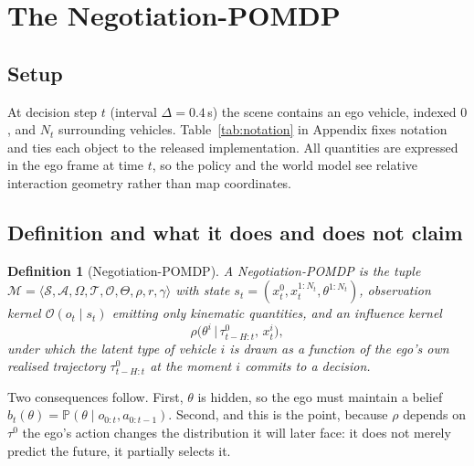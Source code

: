 \documentclass[conference]{IEEEtran}
\newcommand{\Prob}{\mathbb{P}}
\newtheorem{definition}{Definition}
\begin{document}

\section{The Negotiation-POMDP}
\label{sec:formulation}

\subsection{Setup}

At decision step $t$ (interval $\Delta = 0.4$\,s) the scene contains an ego
vehicle, indexed $0$, and $N_t$ surrounding vehicles.
Table~\ref{tab:notation} in Appendix fixes notation and ties each object to the released implementation. All quantities are expressed in the ego frame at time $t$, so the policy and the world model see relative interaction geometry rather than map
coordinates.

\subsection{Definition and what it does and does not claim}

\begin{definition}[Negotiation-POMDP]
\label{def:npomdp}
A Negotiation-POMDP is the tuple
$\mathcal{M} = \langle \mathcal{S}, \mathcal{A}, \Omega, \mathcal{T}, \mathcal{O},
\Theta, \rho, r, \gamma \rangle$
with state $s_t = (x^0_t, x^{1:N_t}_t, \theta^{1:N_t})$, observation kernel
$\mathcal{O}(o_t \mid s_t)$ emitting only kinematic quantities, and an
\emph{influence kernel}
\begin{equation}
\rho\big(\theta^i \,\big|\, \tau^0_{t-H:t},\, x^i_t\big),
\label{eq:kernel}
\end{equation}
under which the latent type of vehicle $i$ is drawn as a function of the ego's
own realised trajectory $\tau^0_{t-H:t}$ at the moment $i$ commits to a decision.
\end{definition}

Two consequences follow. First, $\theta$ is hidden, so the ego must maintain a
belief $b_t(\theta) = \Prob(\theta \mid o_{0:t}, a_{0:t-1})$. Second, and this is
the point, because $\rho$ depends on $\tau^0$ the ego's action changes the
distribution it will later face: it does not merely predict the future, it
partially selects it.
\end{document}
